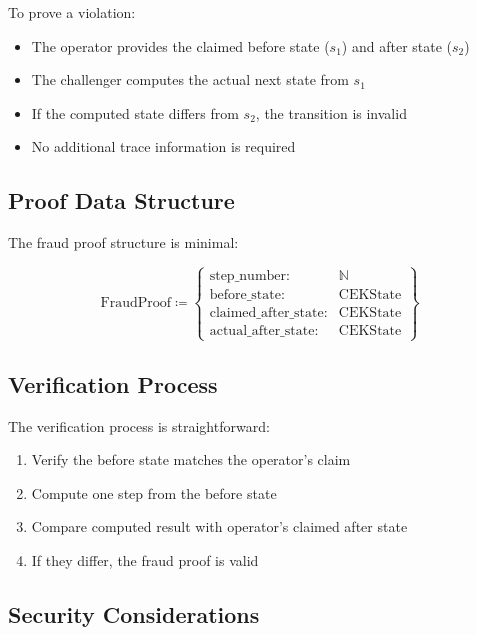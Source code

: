 \documentclass[../midgard.tex]{subfiles}
\begin{document}
To prove a violation:
\begin{itemize}
    \item The operator provides the claimed before state ($s_1$) and after state ($s_2$)
    \item The challenger computes the actual next state from $s_1$
    \item If the computed state differs from $s_2$, the transition is invalid
    \item No additional trace information is required
\end{itemize}

\subsection{Proof Data Structure}

The fraud proof structure is minimal:

\begin{equation*}
    \text{FraudProof} \coloneq \left\{
    \begin{array}{ll}
        \text{step\_number} : & \mathbb{N} \\
        \text{before\_state} : & \text{CEKState} \\
        \text{claimed\_after\_state} : & \text{CEKState} \\
        \text{actual\_after\_state} : & \text{CEKState}
    \end{array} \right\}
\end{equation*}

\subsection{Verification Process}

The verification process is straightforward:

\begin{enumerate}
    \item Verify the before state matches the operator's claim
    \item Compute one step from the before state
    \item Compare computed result with operator's claimed after state
    \item If they differ, the fraud proof is valid
\end{enumerate}

\subsection{Security Considerations}
\end{document}
